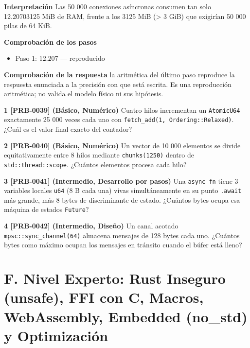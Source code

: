 \documentclass{book}
\begin{document}
\begin{tcolorbox}[title={Problema resuelto}, studiumworked, breakable]
\noindent\textbf{Interpretación}
Las 50 000 conexiones asíncronas consumen tan solo 12.20703125 MiB de RAM, frente a los 3125 MiB (> 3 GiB) que exigirían 50 000 pilas de 64 KiB.

\noindent\textbf{Comprobación de los pasos}
\begin{itemize}
\item Paso 1: $12.207$ — reproducido
\end{itemize}

\noindent\textbf{Comprobación de la respuesta} la aritmética del último paso reproduce la respuesta enunciada a la precisión con que está escrita. Es una reproducción aritmética; no valida el modelo físico ni sus hipótesis.
\end{tcolorbox}

\begin{tcolorbox}[title={Ejercicios}, studiumworked, breakable]

\noindent\textbf{1 [PRB-0039] (Básico, Numérico)}
Cuatro hilos incrementan un \texttt{AtomicU64} exactamente 25 000 veces cada uno con \texttt{fetch\_add(1, Ordering::Relaxed)}. ¿Cuál es el valor final exacto del contador?

\noindent\textbf{2 [PRB-0040] (Básico, Numérico)}
Un vector de 10 000 elementos se divide equitativamente entre 8 hilos mediante \texttt{chunks(1250)} dentro de \texttt{std::thread::scope}. ¿Cuántos elementos procesa cada hilo?

\noindent\textbf{3 [PRB-0041] (Intermedio, Desarrollo por pasos)}
Una \texttt{async fn} tiene 3 variables locales \texttt{u64} (8 B cada una) vivas simultáneamente en su punto \texttt{.await} más grande, más 8 bytes de discriminante de estado. ¿Cuántos bytes ocupa esa máquina de estados \texttt{Future}?

\noindent\textbf{4 [PRB-0042] (Intermedio, Diseño)}
Un canal acotado \texttt{mpsc::sync\_channel(64)} almacena mensajes de 128 bytes cada uno. ¿Cuántos bytes como máximo ocupan los mensajes en tránsito cuando el búfer está lleno?
\end{tcolorbox}

\chapter{F. Nivel Experto: Rust Inseguro (unsafe), FFI con C, Macros, WebAssembly, Embedded (no\_std) y Optimización}
\label{chap:cap07-nivel-experto-unsafe-ffi-macros-wasm-embedded}
\end{document}
